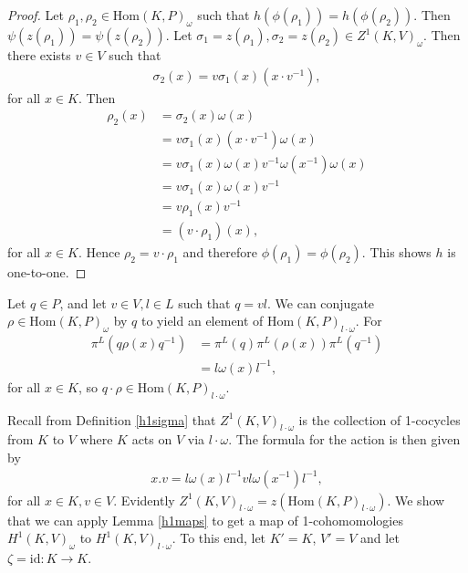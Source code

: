 \begin{proof}
Let $\rho_1, \rho_2\in \mathrm{Hom}(K, P)_\omega$ such that $h(\phi(\rho_1)) = h(\phi(\rho_2))$. Then $\psi(z(\rho_1)) = \psi(z(\rho_2))$.
Let $\sigma_1 = z(\rho_1), \sigma_2 = z(\rho_2) \in Z^1(K, V)_\omega$. Then there exists $v \in V$ such that
\begin{align*} \sigma_2(x) = v \sigma_1(x) \left(x \cdot v^{-1}\right), \end{align*}
for all $x \in K$. Then
\begin{align*}
\rho_2(x) 
&= \sigma_2(x)\omega(x) \\
&= v \sigma_1(x) \left(x \cdot v^{-1}\right) \omega(x) \\
&= v \sigma_1(x) \omega(x) v^{-1} \omega(x^{-1}) \omega(x) \\
&= v \sigma_1(x) \omega(x) v^{-1} \\
&= v \rho_1(x) v^{-1} \\
&= (v \cdot \rho_1)(x),
\end{align*}
for all $x \in K$. Hence $\rho_2 = v\cdot \rho_1$ and therefore $\phi\left(\rho_1\right) = \phi\left(\rho_2\right)$. This shows $h$ is one-to-one.
\end{proof}

Let $q \in P$, and let $v \in V, l \in L$ such that $q = vl$. We can conjugate $\rho \in \mathrm{Hom}(K, P)_\omega$ by $q$ to yield an element of $\mathrm{Hom}(K, P)_{l \cdot \omega}$. For
\begin{align*}%
\pi^L\left(q \rho(x) q^{-1}\right)%
&= \pi^L\left(q\right) \pi^L\left(\rho(x)\right) \pi^L\left(q^{-1}\right) \\
&= l \omega(x) l^{-1},
\end{align*}
for all $x \in K$, so $q \cdot \rho \in \mathrm{Hom}(K, P)_{l\cdot \omega}$.

Recall from Definition \ref{h1sigma} that $Z^1(K, V)_{l \cdot \omega}$ is the collection of 1-cocycles from $K$ to $V$ where $K$ acts on $V$ via $l \cdot \omega$. The formula for the action is then given by
\begin{align*}
	x.v = l \omega(x) l^{-1} v l \omega(x^{-1}) l^{-1},
\end{align*}
for all $x \in K, v \in V$. Evidently $Z^1(K, V)_{l \cdot \omega} = z\left(\mathrm{Hom}(K, P)_{l \cdot \omega}\right)$. 
We show that we can apply Lemma \ref{h1maps} to get a map of 1-cohomomologies $H^1(K, V)_\omega$ to $H^1(K, V)_{l \cdot \omega}$. To this end, let $K' = K$, $V' = V$ and let $\zeta = \mathrm{id}:K \rightarrow K$.

